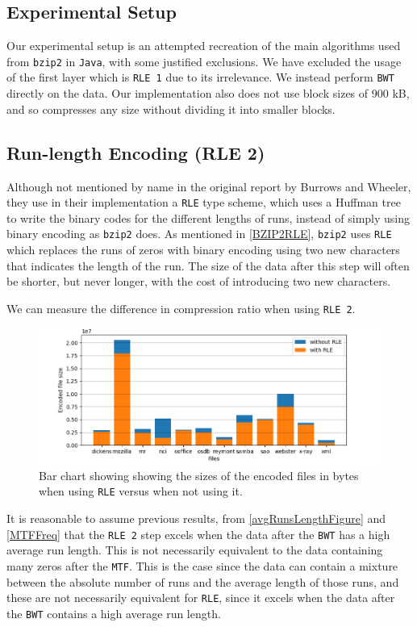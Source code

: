 \documentclass{article}
\begin{document}
\subsection{Experimental Setup}
Our experimental setup is an attempted recreation of the main algorithms used from \texttt{bzip2} in \texttt{Java}, with some justified exclusions. We have excluded the usage of the first layer which is \texttt{RLE 1} due to its irrelevance. We instead perform \texttt{BWT} directly on the data. Our implementation also does not use block sizes of 900 kB, and so compresses any size without dividing it into smaller blocks.

\subsection{Run-length Encoding (RLE 2)}
Although not mentioned by name in the original report by Burrows and Wheeler, they use in their implementation a \texttt{RLE} type scheme, which uses a Huffman tree to write the binary codes for the different lengths of runs, instead of simply using binary encoding as \texttt{bzip2} does.
As mentioned in \cref{BZIP2RLE}, \texttt{bzip2} uses \texttt{RLE} which replaces the runs of zeros with binary encoding using two new characters that indicates the length of the run. The size of the data after this step will often be shorter, but never longer, with the cost of introducing two new characters. 

We can measure the difference in compression ratio when using \texttt{RLE 2}.
\begin{figure}[H]
    \centering
    \includegraphics[width=\textwidth]{images/RLEWithWithout.png}
    \caption{Bar chart showing showing the sizes of the encoded files in bytes when using \texttt{RLE} versus when not using it.}
\end{figure}
It is reasonable to assume previous results, from \cref{avgRunsLengthFigure} and \cref{MTFFreq} that the \texttt{RLE 2} step excels when the data after the \texttt{BWT} has a high average run length. This is not necessarily equivalent to the data containing many zeros after the \texttt{MTF}. This is the case since the data can contain a mixture between the absolute number of runs and the average length of those runs, and these are not necessarily equivalent for \texttt{RLE}, since it excels when the data after the \texttt{BWT} contains a high average run length.
\end{document}
